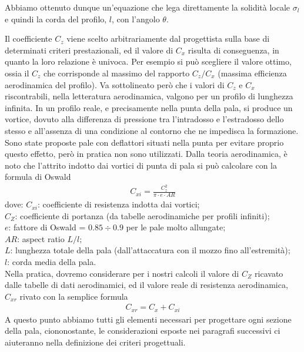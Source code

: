 Abbiamo ottenuto dunque un'equazione che lega direttamente la solidità locale $\sigma_l$ e quindi la corda del profilo, $l$, con l'angolo $\theta$.

Il coefficiente $C_z$ viene scelto arbitrariamente dal progettista sulla base di determinati criteri prestazionali, ed il valore di $C_x$ risulta di conseguenza, in quanto la loro relazione è univoca. Per esempio si può scegliere il valore ottimo, ossia il $C_z$ che corrisponde al massimo del rapporto $C_z/C_x$ (massima efficienza aerodinamica del profilo). Va sottolineato però che i valori di $C_z$ e $C_x$ riscontrabili, nella letteratura aerodinamica, valgono per un profilo di lunghezza infinita. In un profilo reale, e precisamente nella punta della pala, si produce un vortice, dovuto alla differenza di pressione tra l'intradosso e l'estradosso dello stesso e all'assenza di una condizione al contorno che ne impedisca la formazione. Sono state proposte pale con deflattori situati nella punta per evitare proprio questo effetto, però in pratica non sono utilizzati. Dalla teoria aerodinamica, è noto che l'attrito indotto dai vortici di punta di pala si può calcolare con la formula di Oswald
\begin{align*}
C_{xi} = \frac{C_z^2}{\pi \cdot e \cdot AR}
\end{align*}
dove:
$C_{xi}$: coefficiente di resistenza indotta dai vortici;\\
$C_Z$: coefficiente di portanza (da tabelle aerodinamiche per profili infiniti);\\
$e$: fattore di Oswald = $0.85 \div 0.9$ per le pale molto allungate;\\
$AR$: aspect ratio $L/l$;\\
$L$: lunghezza totale della pala (dall'attaccatura con il mozzo fino all'estremità);\\
$l$: corda media della pala.\\[2mm]
Nella pratica, dovremo considerare per i nostri calcoli il valore di $C_Z$ ricavato dalle tabelle di dati aerodinamici, ed il valore reale di resistenza aerodinamica, $C_{xr}$ rivato con la semplice formula
\begin{align*}
C_{xr} = C_x + C_{xi}
\end{align*}
A questo punto abbiamo tutti gli elementi necessari per progettare ogni sezione della pala, ciononostante, le considerazioni esposte nei paragrafi successivi ci aiuteranno nella definizione dei criteri progettuali.

